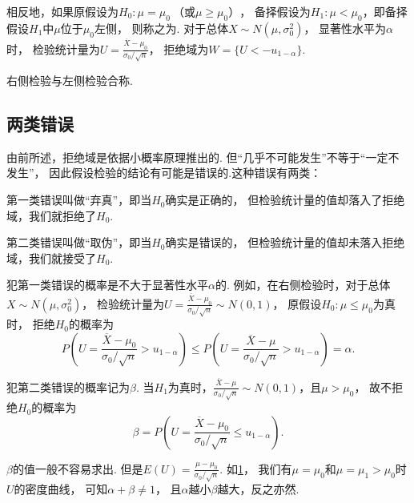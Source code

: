 相反地，如果原假设为\(H_0: \mu=\mu_0\ \text{（或}\mu\geq\mu_0\text{）}\)，
备择假设为\(H_1: \mu<\mu_0\)，即备择假设\(H_1\)中\(\mu\)位于\(\mu_0\)左侧，
则称之为.
对于总体\(X \sim N(\mu,\sigma_0^2)\)，
显著性水平为\(\alpha\)时，
检验统计量为\(U = \frac{\overline{X}-\mu_0}{\sigma_0 / \sqrt{n}}\)，
拒绝域为\(W=\{U<-u_{1-\alpha}\}\).

右侧检验与左侧检验合称.

\subsection{两类错误}
由前所述，拒绝域是依据小概率原理推出的.
但“几乎不可能发生”不等于“一定不发生”，
因此假设检验的结论有可能是错误的.这种错误有两类：

第一类错误叫做“弃真”，即当\(H_0\)确实是正确的，
但检验统计量的值却落入了拒绝域，我们就拒绝了\(H_0\).

第二类错误叫做“取伪”，即当\(H_0\)确实是错误的，
但检验统计量的值却未落入拒绝域，我们就接受了\(H_0\).

犯第一类错误的概率是不大于显著性水平\(\alpha\)的.
例如，在右侧检验时，对于总体\(X \sim N(\mu,\sigma_0^2)\)，
检验统计量为\(U = \frac{\overline{X}-\mu_0}{\sigma_0 / \sqrt{n}} \sim N(0,1)\)，
原假设\(H_0: \mu\leq\mu_0\)为真时，
拒绝\(H_0\)的概率为\[
	P\left(U=\frac{\overline{X}-\mu_0}{\sigma_0 / \sqrt{n}}>u_{1-\alpha}\right)
	\leq P\left(U=\frac{\overline{X}-\mu}{\sigma_0 / \sqrt{n}}>u_{1-\alpha}\right)
	= \alpha.
\]

犯第二类错误的概率记为\(\beta\).
当\(H_1\)为真时，\(\frac{\overline{X}-\mu}{\sigma_0/\sqrt{n}} \sim N(0,1)\)，且\(\mu>\mu_0\)，
故不拒绝\(H_0\)的概率为\[
	\beta=P\left(U=\frac{\overline{X}-\mu_0}{\sigma_0/\sqrt{n}} \leq u_{1-\alpha}\right).
\]

\(\beta\)的值一般不容易求出.
但是\(E(U)=\frac{\mu-\mu_0}{\sigma_0/\sqrt{n}}\).
如\cref{figure:假设检验.两类错误}，
我们有\(\mu=\mu_0\)和\(\mu=\mu_1>\mu_0\)时\(U\)的密度曲线，
可知\(\alpha+\beta\neq1\)，
且\(\alpha\)越小\(\beta\)越大，反之亦然.

\begin{figure}[ht]
	\centering
	\caption{}
	\label{figure:假设检验.两类错误}
\end{figure}

